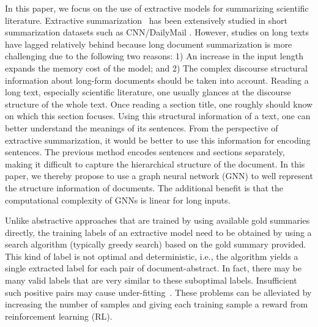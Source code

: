 \documentclass[11pt,a4paper]{article}
\begin{document}
In this paper, we focus on the use of extractive models for summarizing scientific literature.
Extractive summarization~\cite{matchsum_2020,zhou2018neural} has been extensively studied in short summarization datasets such as CNN/DailyMail \cite{cnndm}.
However, studies on long texts have lagged relatively behind because long document summarization is more challenging due to the following two reasons:
1) An increase in the input length expands the memory cost of the model; and
2) The complex discourse structural information about long-form documents should be taken into account.
Reading a long text, especially scientific literature, one usually glances at the discourse structure of the whole text. Once reading a section title, one roughly should know on which this section focuses. Using this structural information  of a text, one can better understand the meanings of its sentences. From the perspective of extractive summarization, it would be better to use this information for encoding sentences.
The previous method encodes sentences and sections separately, making it difficult to capture the hierarchical structure of the document.
In this paper, we thereby propose to use a graph neural network (GNN) to well represent the structure information of documents. The  additional benefit is that the computational complexity of GNNs is linear for long inputs.


Unlike abstractive approaches that are trained by  using available gold summaries directly, the training labels of an extractive model need to be obtained by using a search algorithm (typically greedy search) based on the gold summary provided.
This kind of label is not optimal and deterministic, i.e., the algorithm yields a single extracted label for each pair of document-abstract.
In fact, there may be many valid labels that are very similar to these suboptimal labels.
Insufficient such positive pairs may cause under-fitting~\cite{rl_2018}. 
These problems can be alleviated by increasing the number of samples and giving each training sample a reward from reinforcement learning (RL).
\end{document}
